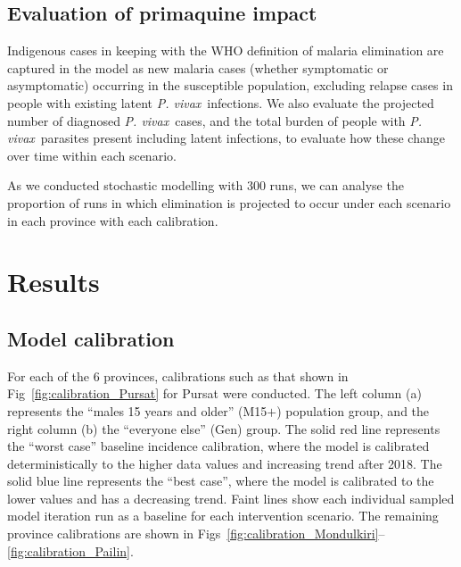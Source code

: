 \documentclass[doublespacing]{bmcart}
\newcommand{\pv}{\textit{P. vivax}}
\newcommand{\males}{M15$+$}
\newcommand{\gen}{Gen}
\begin{document}
\subsection*{Evaluation of primaquine impact}
Indigenous cases in keeping with the WHO definition of malaria elimination \cite{who_2019_definitions} are captured in the model as new malaria cases (whether symptomatic or asymptomatic) occurring in the susceptible population, excluding relapse cases in people with existing latent \pv~infections. We also evaluate the projected number of diagnosed \pv~cases, and the total burden of people with \pv~parasites present including latent infections, to evaluate how these change over time within each scenario.

As we conducted stochastic modelling with 300 runs, we can analyse the proportion of runs in which elimination is projected to occur under each scenario in each province with each calibration.

\section*{Results}

\subsection*{Model calibration}
For each of the 6 provinces, calibrations such as that shown in Fig~\ref{fig:calibration_Pursat} for Pursat were conducted. The left column (a) represents the ``males 15 years and older'' (\males) population group, and the right column (b) the ``everyone else'' (\gen) group. The solid red line represents the ``worst case'' baseline incidence calibration, where the model is calibrated deterministically to the higher data values and increasing trend after 2018. The solid blue line represents the ``best case'', where the model is calibrated to the lower values and has a decreasing trend. Faint lines show each individual sampled model iteration run as a baseline for each intervention scenario. The remaining province calibrations are shown in Figs~\ref{fig:calibration_Mondulkiri}--\ref{fig:calibration_Pailin}.
\end{document}
